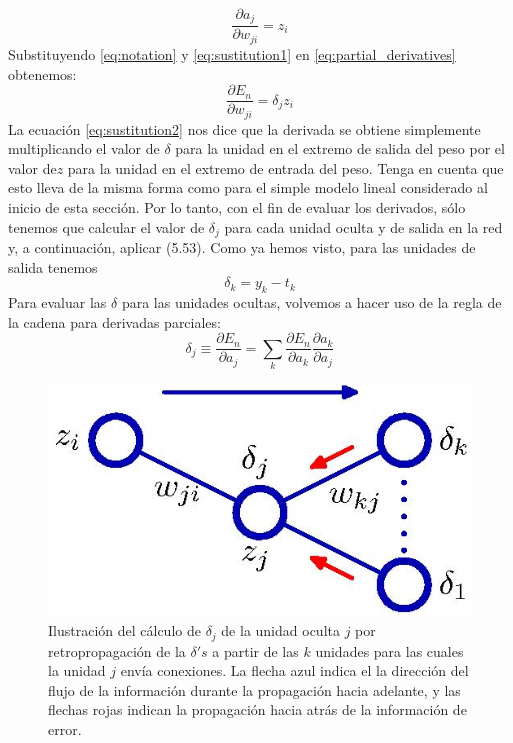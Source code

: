 \documentclass[a4paper,11pt,spanish]{book}
\begin{document}
	\begin{equation} \label{eq:sustitution1}
	  \frac{\partial a_j}{\partial w_{ji}} = z_i
	\end{equation}
	Substituyendo \eqref{eq:notation} y \eqref{eq:sustitution1} en \eqref{eq:partial_derivatives} obtenemos:
	\begin{equation} \label{eq:sustitution2}
	  \frac{\partial E_n}{\partial w_{ji}} = \delta_j z_i
	\end{equation}
	La ecuación \eqref{eq:sustitution2} nos dice que la derivada se obtiene simplemente multiplicando el valor de $\delta$ para la unidad en el extremo de salida del peso 
	por el valor de$z$ para la unidad en el extremo de entrada del peso. Tenga en cuenta que esto lleva de la misma forma como para el simple modelo lineal considerado al inicio de esta sección.
	Por lo tanto, con el fin de evaluar los derivados, sólo tenemos que calcular el valor de $\delta_j$ para cada unidad oculta y de salida  en la red y, a continuación, aplicar (5.53). 
	Como ya hemos visto, para las unidades de salida tenemos
	\begin{equation} \label{eq:delta_salida}
	  \delta_k = y_k - t_k
	\end{equation}
	Para evaluar las $\delta$ para las unidades ocultas, volvemos a hacer uso de la regla de la cadena para derivadas parciales:
	\begin{equation}\label{eq:chain_rule}
	  \delta_j \equiv \frac{\partial E_n}{\partial a_j} = \sum_k \frac{\partial E_n}{\partial a_k} \frac{\partial a_k}{\partial a_j}
	\end{equation}
	\begin{figure}[h]
	  \begin{center}
	  \includegraphics[width=0.5\linewidth]{./img/bishop_backpropagation.jpg}
	  \end{center}
	  \caption{Ilustración del cálculo de $\delta_j$ de la unidad oculta  $j$ por retropropagación de la $\delta 's$ a partir de las $k$ unidades para las cuales la unidad $j$ envía 
	    conexiones. La flecha azul indica el la dirección del flujo de la información durante la propagación hacia adelante, y las flechas rojas indican la propagación 
	    hacia atrás de la información de error.}
	  \label{fig:backpropagation}
	\end{figure}
\end{document}
